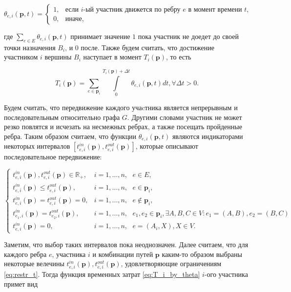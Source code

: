 \documentclass[12pt, a4paper]{article}
\begin{document}
$$
\theta_{e, i} (\textbf{p}, t) =
\begin{cases}
	1, & \text{если }  i\text{-ый участник движется по ребру $e$ в момент времени $t$,}  \\
	0, & \text{иначе},
\end{cases}
$$

где $\sum\limits_{e \in E} \theta_{e, i} (\textbf{p}, t)$ принимает значение $1$ пока участник не доедет до своей точки назначения $B_i$, и $0$ после. Также будем считать, что достижение  участником $i$ вершины $B_i$ наступает в момент $T_i(\textbf{p})$, то есть 
	
\begin{equation}
	\label{eq:T_i_by_theta}
	T_i(\textbf{p}) = \sum \limits_{e \in \textbf{p}_i} \int\limits_{0}^{T_i(\textbf{p}) + \Delta t} \theta_{e, i} (\textbf{p}, t) dt, \forall \Delta t > 0.
\end{equation}

Будем считать, что передвижение каждого учаcтника является непрерывным и последовательным относительно графа $G$. Другими словами участник не может резко повлятся и исчезать на несмежных ребрах, а также посещать пройденные ребра. Таким образом считаем, что функции $\theta_{e, i} (\textbf{p}, t)$ являются индикаторами некоторых интервалов $[t_{e, i}^{in} (\textbf{p}), t_{e, i}^{out} (\textbf{p})]$, которые описывают последовательное передвижение:

\begin{equation}
	\label{eq:restr_t}
	\begin{cases}
		t_{e, i}^{in}(\textbf{p}), t_{e, i}^{out}(\textbf{p}) \in \mathbb{R}_+,  & i = 1, \dots, n, \text{ } e \in E, \\
		t_{e, i}^{in}(\textbf{p}) \le t_{e, i}^{out}(\textbf{p}), & i = 1, \dots, n, \text{ } e \in \textbf{p}_i,  \\
		t_{e, i}^{in}(\textbf{p}) = t_{e, i}^{out}(\textbf{p}) = 0, & i = 1, \dots, n, \text{ } e \notin \textbf{p}_i, \\
		t_{e_1, i}^{in} (\textbf{p}) = t_{e_2, i}^{out} (\textbf{p}), & i = 1, \dots, n, \text{ } e_1, e_2 \in \textbf{p}_i, \exists A, B, C \in V: e_1 = (A, B), e_2 = (B, C)\\
		t_{e, i}^{in} (\textbf{p}) = 0, & i = 1, \dots, n, \text{ } e = (A_i, X), X \in V.
	\end{cases}
\end{equation}

Заметим, что выбор таких интервалов пока неоднозначен. Далее считаем, что для каждого ребра $e$, участника $i$ и комбинации путей $\textbf{p}$ каким-то образом выбраны некоторые велечины $t_{e, i}^{in}(\textbf{p}), t_{e, i}^{out}(\textbf{p})$, удовлетворяющие ограничениям \eqref{eq:restr_t}. Тогда функция временных затрат \eqref{eq:T_i_by_theta} $i$-ого участника примет вид
\end{document}
